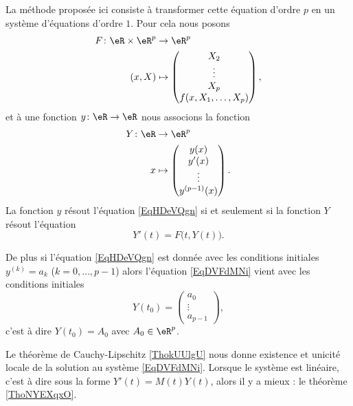 La méthode proposée ici consiste à transformer cette équation d'ordre \( p\) en un système d'équations d'ordre \( 1\). Pour cela nous posons
\begin{equation}
    \begin{aligned}
        F\colon \eR\times \eR^p&\to \eR^p \\
        (x,X)&\mapsto \begin{pmatrix}
            X_2    \\ 
            \vdots    \\ 
            X_p    \\ 
            f(x,X_1,\ldots, X_p)    
        \end{pmatrix},
    \end{aligned}
\end{equation}
et à une fonction \( y\colon \eR\to \eR\) nous associons la fonction
\begin{equation}
    \begin{aligned}
        Y\colon \eR&\to \eR^p \\
        x&\mapsto \begin{pmatrix}
            y(x)    \\ 
            y'(x)    \\ 
            \vdots    \\ 
            y^{(p-1)}(x)    
        \end{pmatrix}.
    \end{aligned}
\end{equation}
La fonction \( y\) résout l'équation \eqref{EqHDeVQgn} si et seulement si la fonction \( Y\) résout l'équation
\begin{equation}    \label{EqDVFdMNi}
    Y'(t)=F\big( t,Y(t) \big).
\end{equation}

De plus si l'équation \eqref{EqHDeVQgn} est donnée avec les conditions initiales \( y^{(k)}=a_k\) (\( k=0,\ldots, p-1\)) alors l'équation \eqref{EqDVFdMNi} vient avec les conditions initiales
\begin{equation}
    Y(t_0)=\begin{pmatrix}
        a_0    \\ 
        \vdots    \\ 
        a_{p-1}    
    \end{pmatrix},
\end{equation}
c'est à dire \( Y(t_0)=A_0\) avec \( A_0\in \eR^p\).

Le théorème de Cauchy-Lipschitz \ref{ThokUUlgU} nous donne existence et unicité locale de la solution au système \ref{EqDVFdMNi}. Lorsque le système est linéaire, c'est à dire sous la forme \( Y'(t)=M(t)Y(t)\), alors il y a mieux : le théorème \ref{ThoNYEXqxO}.

